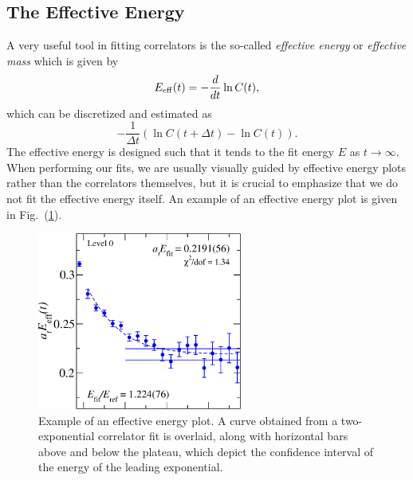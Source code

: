 \subsection{The Effective Energy}\label{sec:eff_mass}
A very useful tool in fitting correlators is the so-called \emph{effective energy} or \emph{effective mass} which is given by
\begin{equation}
    E_{\rm{eff}}(t) = -\frac{d}{dt}\ln C(t),
\end{equation}
which can be discretized and estimated as
\begin{equation}
    -\frac{1}{\Delta t}\left(\ln C(t+\Delta t)-\ln C(t)\right).
\end{equation}
The effective energy is designed such that it tends to the fit energy $E$ as $t\rightarrow \infty$. When performing our fits, we are usually visually guided by effective energy plots rather than the correlators themselves, but it is crucial to emphasize that we do not fit the effective energy itself. An example of an effective energy plot is given in Fig.~(\ref{fig:eff_en_ex}).

\begin{figure}
    \centering
    \hspace*{-0.75in}\includegraphics[width=0.6\textwidth]{figures/effmass.pdf}
    \caption{Example of an effective energy plot. A curve obtained from a two-exponential correlator fit is overlaid, along with horizontal bars above and below the plateau, which depict the confidence interval of the energy of the leading exponential.}\label{fig:eff_en_ex}
\end{figure}

